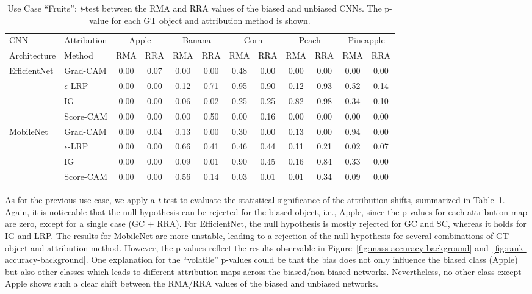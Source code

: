 \documentclass[runningheads]{llncs}
\newcommand{\Fig}[1]{Figure~\ref{#1}}
\newcommand{\Tab}[1]{Table~\ref{#1}}
\begin{document}
\begin{table}[t]
    \centering
    \caption{Use Case \enquote{Fruits}: \emph{t}-test between the RMA and RRA values of the biased and unbiased CNNs. The p-value for each GT object and attribution method is shown.}
    \begin{tabular}{ll||cc | cc | cc | cc | cc}
         CNN & Attribution & \multicolumn{2}{c|}{Apple} & \multicolumn{2}{c|}{Banana} & \multicolumn{2}{c|}{Corn} & \multicolumn{2}{c|}{Peach} & \multicolumn{2}{c}{Pineapple} \\
        Architecture &    Method & RMA & RRA & RMA & RRA & RMA & RRA & RMA & RRA & RMA & RRA  \\ \hline
          \multirow{4}{*}{EfficientNet}  & Grad-CAM & 0.00 & 0.07 & 0.00 & 0.00 & 0.48 & 0.00 & 0.00 & 0.00 & 0.00 & 0.00\\
          & $\epsilon$-LRP & 0.00 & 0.00 & 0.12 & 0.71 & 0.95 & 0.90 & 0.12 & 0.93 & 0.52 & 0.14 \\
          & IG & 0.00 & 0.00 & 0.06 & 0.02 & 0.25 & 0.25 & 0.82 & 0.98 & 0.34 & 0.10 \\
          & Score-CAM & 0.00 & 0.00 & 0.00 & 0.50 & 0.00 & 0.16 & 0.00 & 0.00 & 0.00 & 0.00\\ \hline
          \multirow{4}{*}{MobileNet} & Grad-CAM & 0.00 & 0.04 & 0.13 & 0.00 & 0.30 & 0.00 & 0.13 & 0.00 & 0.94 & 0.00\\
          & $\epsilon$-LRP & 0.00 & 0.00 & 0.66 & 0.41 & 0.46 & 0.44 & 0.11 & 0.21 & 0.02 & 0.07\\
          & IG & 0.00 & 0.00 & 0.09 & 0.01 & 0.90 & 0.45 & 0.16 & 0.84 & 0.33 & 0.00 \\
          & Score-CAM & 0.00 & 0.00 & 0.56 & 0.14 & 0.03 & 0.01 & 0.01 & 0.34 & 0.09 & 0.00 
    \end{tabular}
    \label{tab:pvalues-fruits}
    \vspace{-5mm}
\end{table}

As for the previous use case, we apply a \emph{t}-test to evaluate the statistical significance of the attribution shifts, summarized in \Tab{tab:pvalues-fruits}. Again, it is noticeable that the null hypothesis can be rejected for the biased object, i.e., Apple, since the p-values for each attribution map are zero, except for a single case (GC $+$ RRA).
For EfficientNet, the null hypothesis is mostly rejected for GC and SC, whereas it holds for IG and LRP. The results for MobileNet are more unstable, leading to a rejection of the null hypothesis for several combinations of GT object and attribution method. However, the p-values reflect the results observable in \Fig{fig:mass-accuracy-background} and~\ref{fig:rank-accuracy-background}. 
One explanation for the \enquote{volatile} p-values could be that the bias does not only influence the biased class (Apple) but also other classes which leads to different attribution maps across the biased/non-biased networks. Nevertheless, no other class except Apple shows such a clear shift between the RMA/RRA values of the biased and unbiased networks.
\end{document}
